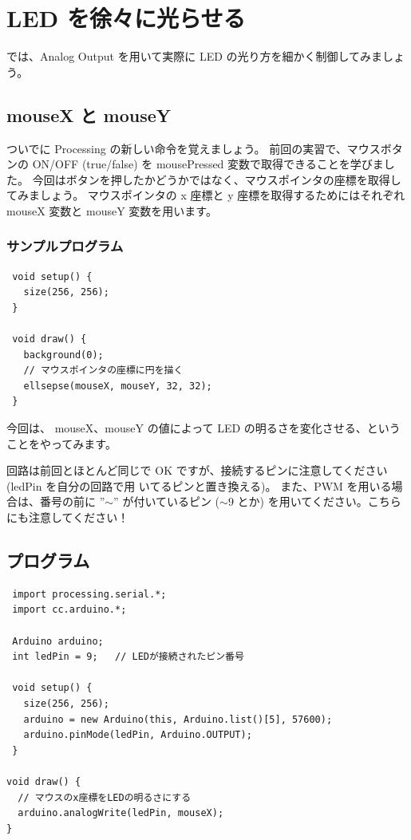 \documentclass[11pt,a4paper]{jarticle}
\begin{document}
\section{LED を徐々に光らせる}
では、Analog Output を用いて実際に LED の光り方を細かく制御してみましょう。

\subsection*{mouseX と mouseY}
ついでに Processing の新しい命令を覚えましょう。
前回の実習で、マウスボタンの ON/OFF (true/false) を mousePressed 変数で取得できることを学びました。
今回はボタンを押したかどうかではなく、マウスポインタの座標を取得してみましょう。
マウスポインタの x 座標と y 座標を取得するためにはそれぞれ mouseX 変数と mouseY 変数を用います。

\subsubsection*{サンプルプログラム}
\begin{lstlisting}
 void setup() {
   size(256, 256);
 }

 void draw() {
   background(0);
   // マウスポインタの座標に円を描く
   ellsepse(mouseX, mouseY, 32, 32);
 }
\end{lstlisting}

今回は、 mouseX、mouseY の値によって LED の明るさを変化させる、ということをやってみます。

回路は前回とほとんど同じで OK ですが、接続するピンに注意してください (ledPin を自分の回路で用
いてるピンと置き換える)。
また、PWM を用いる場合は、番号の前に ''$\sim$'' が付いているピン ($\sim9$ とか) を用いてください。こちらにも注意してください！


\subsection*{プログラム}
\begin{lstlisting}
 import processing.serial.*;
 import cc.arduino.*;
 
 Arduino arduino;
 int ledPin = 9;   // LEDが接続されたピン番号

 void setup() {
   size(256, 256);
   arduino = new Arduino(this, Arduino.list()[5], 57600);
   arduino.pinMode(ledPin, Arduino.OUTPUT);
 }

void draw() {
  // マウスのx座標をLEDの明るさにする 
  arduino.analogWrite(ledPin, mouseX);
}
\end{lstlisting}
\end{document}

